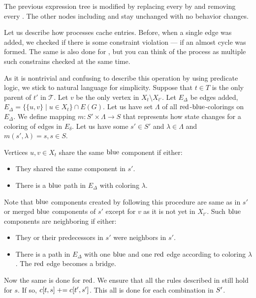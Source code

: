 The previous expression tree is modified by
replacing every \IntroduceVertexNode{} by \IntroduceVertexWithEdgesNode{}
and removing every \IntroduceEdgeNode{}.
The other nodes including \ForgetVertexNode{} and \JoinNode{} stay unchanged
with no behavior changes.

Let us describe how \IntroduceVertexWithEdgesNode{} processes cache entries.
Before, when a single edge was added,
we checked if there is some constraint violation
--- if an almost cycle was formed.
The same is also done for \IntroduceVertexWithEdgesNode{},
but you can think of the process as
multiple such constrains checked at the same time.

As it is nontrivial and confusing to describe this operation
by using predicate logic, we stick to natural language for simplicity.
Suppose that \( t \in T \) is
the only parent of \( t'\) in \( \mathcal {T} \).
Let \( v \) be the only vertex in \( X_t \setminus X_{t'} \).
Let \( E_\Delta \) be edges added,
\( E_\Delta = \{ \{ u, v \} \mid u \in X_t \} \cap E(G) \).
Let us have set \( \Lambda \) of all \( \text{red} \)-\( \text{blue} \)-colorings on \( E_\Delta \).
We define mapping \( m: S' \times \Lambda \to S \)
that represents how state changes for a coloring of edges in \( E_\delta \).
Let us have some \( s' \in S' \) and \( \lambda \in \Lambda \)
and \( m(s', \lambda) = s, s \in S \).

Vertices \( u, v \in X_t \) share the same \( \text{blue} \) component if either:
%
\begin{itemize}
	\item They shared the same component in \( s' \).
	\item There is a \( \text{blue} \) path in \( E_\Delta \) with coloring \( \lambda \).
\end{itemize}
%
Note that \( \text{blue} \) components created by following this procedure
are same as in \( s' \) or merged \( \text{blue} \) components of \( s' \)
except for \( v \) as it is not yet in \( X_{t'} \).
Such \( \text{blue} \) components are neighboring if either:
%
\begin{itemize}
	\item They or their predecessors in \( s' \)
	      were neighbors in \( s' \).
	\item There is a path in \( E_\Delta \) with
	      one \( \text{blue} \) and one \( \text{red} \) edge
	      according to coloring \( \lambda \).
	      The \( \text{red} \) edge becomes a bridge.
\end{itemize}
%
Now the same is done for \( \text{red} \).
We ensure that all the rules described in \IntroduceEdgeNode{}
still hold for \( s \). If so, \( c[t, s] \mathrel{+}= c[t', s'] \).
This all is done for each combination in \( S' \time \Lambda \).

